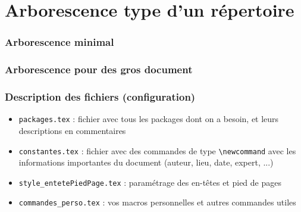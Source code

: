 \section{Arborescence type d'un répertoire}

\begin{frame}
    \frametitle{Arborescence minimal}
\end{frame}

\begin{frame}
    \frametitle{Arborescence pour des gros document}
\end{frame}

\begin{frame}
\end{frame}

\begin{frame}
\end{frame}

\begin{frame}[containsverbatim]
    \frametitle{Description des fichiers (configuration)}
    \begin{itemize}[label=$\triangleright$]
        \item \texttt{packages.tex} : fichier avec tous les packages dont on a besoin, et leurs descriptions en commentaires
        \item \texttt{constantes.tex} : fichier avec des commandes de type \verb|\newcommand| avec les informations importantes du document (auteur, lieu, date, expert, ...)
        \item \texttt{style\_entetePiedPage.tex} : paramétrage des en-têtes et pied de pages
        \item \texttt{commandes\_perso.tex} : vos macros personnelles et autres commandes utiles
    \end{itemize}
\end{frame}

